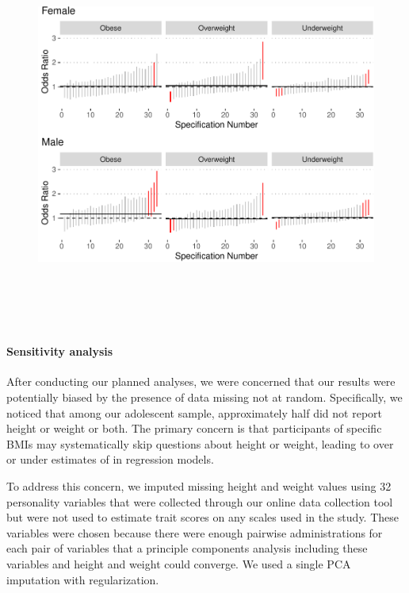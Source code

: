 \documentclass[man]{apa6}
\let\oldparagraph\paragraph
\renewcommand{\paragraph}[1]{\oldparagraph{#1}\mbox{}}
\begin{document}
\begin{figure}
\includegraphics[height=5in]{bmi_personality_files/figure-latex/SESplot2-1} \caption{ }\label{fig:SESplot2}
\end{figure}

\hypertarget{sensitivity-analysis}{%
\paragraph{Sensitivity analysis}\label{sensitivity-analysis}}

After conducting our planned analyses, we were concerned that our results were potentially biased by the presence of data missing not at random. Specifically, we noticed that among our adolescent sample, approximately half did not report height or weight or both. The primary concern is that participants of specific BMIs may systematically skip questions about height or weight, leading to over or under estimates of in regression models.

To address this concern, we imputed missing height and weight values using 32 personality variables that were collected through our online data collection tool but were not used to estimate trait scores on any scales used in the study. These variables were chosen because there were enough pairwise administrations for each pair of variables that a principle components analysis including these variables and height and weight could converge. We used a single PCA imputation with regularization.
\end{document}
